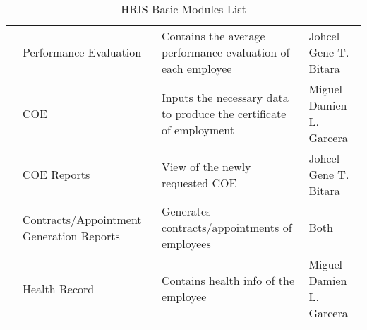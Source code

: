 \begin{table}[H]
\begin{tabular}{@{}p{2cm}p{3.5cm}p{6cm}p{3.5cm}@{}}
                        & Performance Evaluation                   & Contains the average performance evaluation of each employee                          & Johcel Gene T. Bitara               \\
                        & COE                                      & Inputs the necessary data to produce the certificate of employment                    & Miguel Damien L. Garcera                \\
                        & COE Reports                              & View of the newly requested COE                                                       & Johcel Gene T. Bitara               \\
                        & Contracts/Appointment Generation Reports & Generates contracts/appointments of employees                                         & Both               \\
                        & Health Record                            & Contains health info of the employee                                                  & Miguel Damien L. Garcera               \\ \bottomrule
    \end{tabular}
    \caption{HRIS Basic Modules List}
    \label{tab:hris-basic-modules}
\end{table}

